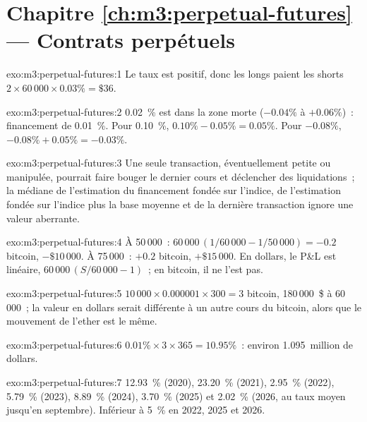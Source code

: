 \section*{Chapitre \ref{ch:m3:perpetual-futures} --- Contrats perpétuels}

\begin{solution}{exo:m3:perpetual-futures:1}
Le taux est positif, donc les longs paient les shorts $2 \times 60\,000 \times 0.03\% = \$36$.
\end{solution}

\begin{solution}{exo:m3:perpetual-futures:2}
0.02~\% est dans la zone morte ($-0.04\%$ à $+0.06\%$)~: financement de 0.01~\%. Pour 0.10~\%, $0.10\% - 0.05\% = 0.05\%$.
Pour $-0.08\%$, $-0.08\% + 0.05\% = -0.03\%$.
\end{solution}

\begin{solution}{exo:m3:perpetual-futures:3}
Une seule transaction, éventuellement petite ou manipulée, pourrait faire bouger le dernier cours et déclencher des liquidations~; la médiane
de l'estimation du financement fondée sur l'indice, de l'estimation fondée sur l'indice plus la base moyenne et de la dernière transaction ignore une valeur aberrante.
\end{solution}

\begin{solution}{exo:m3:perpetual-futures:4}
À 50\,000~: $60\,000\,(1/60\,000 - 1/50\,000) = -0.2$ bitcoin, $-\$10\,000$. À 75\,000~: $+0.2$ bitcoin,
$+\$15\,000$. En dollars, le P\&L est linéaire, $60\,000\,(S/60\,000 - 1)$~; en bitcoin, il ne l'est pas.
\end{solution}

\begin{solution}{exo:m3:perpetual-futures:5}
$10\,000 \times 0.000001 \times 300 = 3$ bitcoin, 180\,000~\$ à 60\,000~; la valeur en dollars serait différente à un autre
cours du bitcoin, alors que le mouvement de l'ether est le même.
\end{solution}

\begin{solution}{exo:m3:perpetual-futures:6}
$0.01\% \times 3 \times 365 = 10.95\%$~: environ 1.095~million de dollars.
\end{solution}

\begin{solution}{exo:m3:perpetual-futures:7}
12.93~\% (2020), 23.20~\% (2021), 2.95~\% (2022), 5.79~\% (2023), 8.89~\% (2024), 3.70~\% (2025) et 2.02~\% (2026,
au taux moyen jusqu'en septembre). Inférieur à 5~\% en 2022, 2025 et 2026.
\end{solution}

